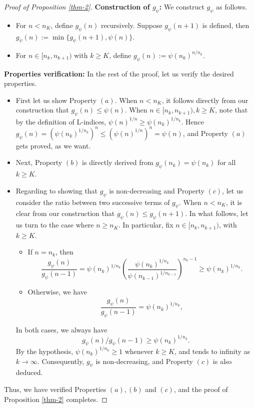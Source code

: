 \documentclass[12pt,reqno]{amsart}
\renewcommand{\=}{\coloneqq}
\theoremstyle{plain}
\begin{document}
\begin{proof}[Proof of Proposition \ref{thm-2}]
\textbf{Construction of $g_{\psi}$:} We construct $g_\psi$ as follows.
\begin{itemize}
\item For $n<n_K$, define $g_\psi(n)$ recursively. Suppose $g_\psi(n+1)$ is defined, then $g_\psi(n):=\min\{g_\psi(n+1), \psi(n)\}$.
\item For $n \in [n_k, n_{k+1})$ with $k\geq K$, define $g_\psi(n):={\psi(n_k)}^{n/n_k}$.
\end{itemize}
\textbf{Properties verification:} In the rest of the proof, let us verify the desired properties.
\begin{itemize}
\item First let us show Property $(a)$. When $n<n_K$, it follows directly from our construction that $g_\psi(n)\leq \psi(n)$. When $n \in [n_k, n_{k+1}), k\geq K$, note that by the definition of L-indices, $\psi(n)^{1/n} \geq \psi(n_k)^{1/n_k}$. Hence $g_\psi(n) = \left({\psi(n_k)}^{1/n_k}\right)^n \leq \left({\psi(n)}^{1/n}\right)^n = \psi(n)$, and Property $(a)$ gets proved, as we want.
\item Next, Property $(b)$ is directly derived from $g_\psi(n_k) = \psi(n_k)$ for all $k\geq K$.
\item Regarding to showing that $g_{\psi}$ is non-decreasing and Property $(c)$, let us consider the ratio between two successive terms of $g_\psi$. When $n<n_K$, it is clear from our construction that $g_\psi(n)\leq g_\psi(n+1)$. In what follows, let us turn to the case where $n\geq n_K$. In particular, fix $n\in [n_k, n_{k+1})$, with $k\geq K$.
\begin{itemize}
\item If $n=n_k$, then
\begin{equation*}
\frac{g_\psi(n)}{g_\psi(n-1)} = {\psi(n_k)}^{1/n_k}\left(\frac{ {\psi(n_k)}^{1/n_k} }{{\psi(n_{k-1})}^{1/n_{k-1}}}\right)^{n_k-1} \geq \psi(n_k)^{1/n_k}.
\end{equation*}
\item Otherwise, we have
\begin{equation*}
\frac{g_\psi(n)}{g_\psi(n-1)} = \psi(n_k)^{1/n_k},
\end{equation*}
\end{itemize}
In both cases, we always have
\begin{equation}
g_\psi(n)/g_\psi(n-1) \geq \psi(n_k)^{1/n_k}.
\end{equation}
By the hypothesis, $\psi(n_k)^{1/n_k}\geq 1$ whenever $k\geq K$, and tends to infinity as $k\to \infty$. Consequently, $g_\psi$ is non-decreasing, and Property $(c)$ is also deduced.
\end{itemize}
Thus, we have verified Properties $(a),(b)$ and $(c)$, and the proof of Proposition \ref{thm-2} completes.
\end{proof}
		
\end{document}
